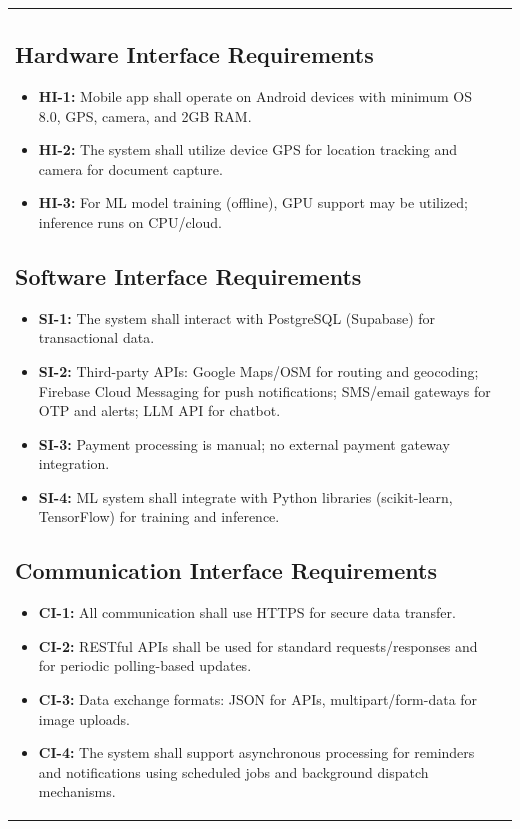 \begin{longtable}{|>{\raggedright\arraybackslash}p{4cm}|>{\raggedright\arraybackslash}p{11cm}|}
\subsection{Hardware Interface Requirements}
\begin{itemize}
\item \textbf{HI-1:} Mobile app shall operate on Android devices with minimum OS 8.0, GPS, camera, and 2GB RAM.
\item \textbf{HI-2:} The system shall utilize device GPS for location tracking and camera for document capture.
\item \textbf{HI-3:} For ML model training (offline), GPU support may be utilized; inference runs on CPU/cloud.
\end{itemize}

\subsection{Software Interface Requirements}
\begin{itemize}
\item \textbf{SI-1:} The system shall interact with PostgreSQL (Supabase) for transactional data.
\item \textbf{SI-2:} Third-party APIs: Google Maps/OSM for routing and geocoding; Firebase Cloud Messaging for push notifications; SMS/email gateways for OTP and alerts; LLM API for chatbot.
\item \textbf{SI-3:} Payment processing is manual; no external payment gateway integration.
\item \textbf{SI-4:} ML system shall integrate with Python libraries (scikit-learn, TensorFlow) for training and inference.
\end{itemize}

\subsection{Communication Interface Requirements}
\begin{itemize}
\item \textbf{CI-1:} All communication shall use HTTPS for secure data transfer.
\item \textbf{CI-2:} RESTful APIs shall be used for standard requests/responses and for periodic polling-based updates.
\item \textbf{CI-3:} Data exchange formats: JSON for APIs, multipart/form-data for image uploads.
\item \textbf{CI-4:} The system shall support asynchronous processing for reminders and notifications using scheduled jobs and background dispatch mechanisms.
\end{itemize}


\end{longtable}
